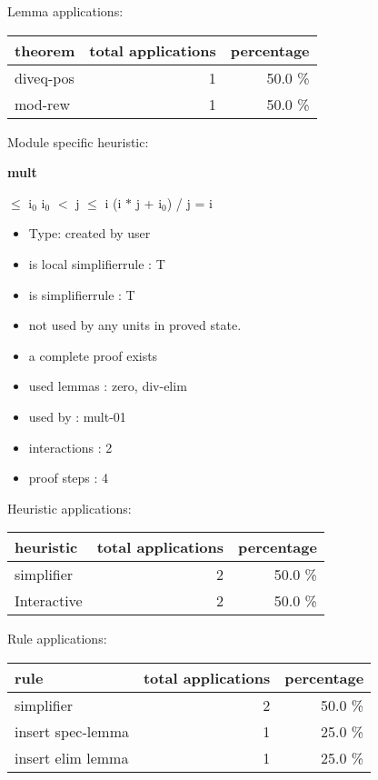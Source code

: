 \documentclass[a4paper]{article}
\begin{document}
Lemma applications:

\begin{supertabular}{l|r|r}
theorem	        & total applications & percentage \\ \hline
diveq-pos & 1 & 50.0 \% \\
mod-rew & 1 & 50.0 \% \\

\end{supertabular}

Module specific heuristic:

\pagebreak

{\LARGE\bf mult}\label{lemma-mult}

\medskip

  $\le$ $\mbox{i}_{0}$ \And $\mbox{i}_{0}$ $<$ j  $\le$ i \Imp (i $*$ j + $\mbox{i}_{0}$) / j = i

\begin{itemize}

\item Type: created by user

\item is local simplifierrule : T
\item is simplifierrule : T
\item not used by any units in proved state.
\item       a complete proof exists
\item       used lemmas  : zero, div-elim
\item       used by      : mult-01
\item       interactions : 2
\item       proof steps  : 4
\end{itemize}

\medskip


Heuristic applications:

\begin{supertabular}{l|r|r}
heuristic	& total applications & percentage \\ \hline
simplifier & 2 & 50.0 \% \\
Interactive & 2 & 50.0 \% \\

\end{supertabular}

Rule applications:

\begin{supertabular}{l|r|r}
rule	        & total applications & percentage \\ \hline
simplifier & 2 & 50.0 \% \\
insert spec-lemma & 1 & 25.0 \% \\
insert elim lemma & 1 & 25.0 \% \\

\end{supertabular}
\end{document}
